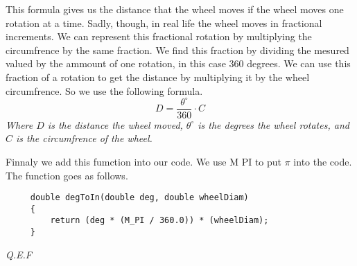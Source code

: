 \documentclass[12pt]{article}
\begin{document}
    \raggedright
    This formula gives us the distance that the wheel moves if the wheel moves one rotation at a time. Sadly, though, in real life the wheel moves in fractional increments. We can represent this fractional rotation by multiplying the circumfrence by the same fraction. We find this fraction by dividing the mesured valued by the ammount of one rotation, in this case 360 degrees. We can use this fraction of a rotation to get the distance by multiplying it by the wheel circumfrence. So we use the following formula.
    $$ D = \frac{\theta^\circ}{360} \cdot C $$
    \center\textit{Where $D$ is the distance the wheel moved, $\theta^\circ$ is the degrees the wheel rotates, and $C$ is the circumfrence of the wheel.}

    \raggedright
    Finnaly we add this fumction into our code. We use M PI to put $\pi$ into the code. The function goes as follows.

    \begin{verbatim}
     double degToIn(double deg, double wheelDiam)
     {
         return (deg * (M_PI / 360.0)) * (wheelDiam);
     }
    \end{verbatim}

    \textit{Q.E.F}
\end{document}
